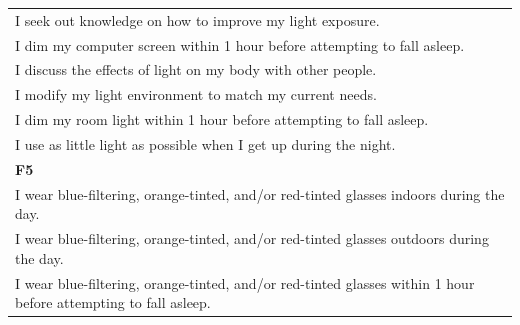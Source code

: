 \documentclass[
  english,
  man]{apa6}
\begin{document}
\begin{appendix}
\begin{longtable}[]{@{}
  >{\raggedright\arraybackslash}p{}@{}}
I seek out knowledge on how to improve my light exposure. \\
I dim my computer screen within 1 hour before attempting to fall
asleep. \\
I discuss the effects of light on my body with other people. \\
I modify my light environment to match my current needs. \\
I dim my room light within 1 hour before attempting to fall asleep. \\
I use as little light as possible when I get up during the night. \\
\textbf{F5} \\
I wear blue-filtering, orange-tinted, and/or red-tinted glasses indoors
during the day. \\
I wear blue-filtering, orange-tinted, and/or red-tinted glasses outdoors
during the day. \\
I wear blue-filtering, orange-tinted, and/or red-tinted glasses within 1
hour before attempting to fall asleep. \\
\bottomrule
\end{longtable}
\end{appendix}
\end{document}
